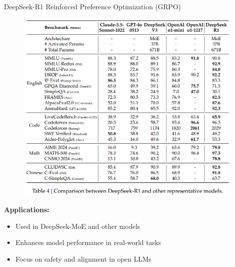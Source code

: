 \begin{frame}[allowframebreaks]{DeepSeek-R1 Reinforced Preference Optimization (GRPO)}
\begin{figure}
    \end{figure}
\framebreak
    \begin{figure}
        \centering
        \includegraphics[height=0.88\textheight,width=1.05\textwidth,keepaspectratio]{images/recent-advance/deepseek-evaluation.png}
    \end{figure}
\framebreak
    \textbf{Applications:}
    \begin{itemize}
        \item Used in DeepSeek-MoE and other models
        \item Enhances model performance in real-world tasks
        \item Focus on safety and alignment in open LLMs
    \end{itemize}
\end{frame}